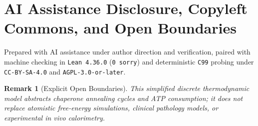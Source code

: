 \documentclass[11pt,a4paper]{article}
\newtheorem{remark}{Remark}
\begin{document}
\section*{AI Assistance Disclosure, Copyleft Commons, and Open Boundaries}
Prepared with AI assistance under author direction and verification, paired with machine checking in \texttt{Lean~4.36.0} (\texttt{0~sorry}) and deterministic \texttt{C99} probing under \texttt{CC-BY-SA-4.0} and \texttt{AGPL-3.0-or-later}.

\begin{remark}[Explicit Open Boundaries]
This simplified discrete thermodynamic model abstracts chaperone annealing cycles and ATP consumption; it does not replace atomistic free-energy simulations, clinical pathology models, or experimental \emph{in vivo} calorimetry.
\end{remark}
\end{document}
